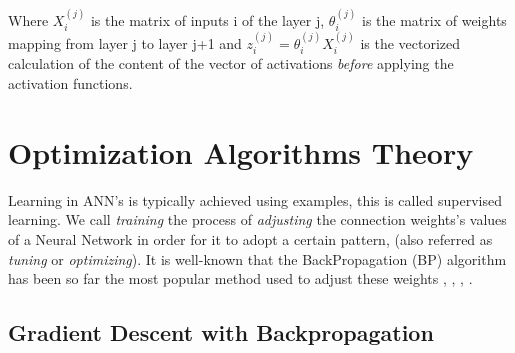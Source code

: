 \documentclass[a4paper,12pt, oneside]{memoir}
\begin{document}
Where $X_i^{(j)}$ is the matrix of inputs i of the layer j, $\theta_i^{(j)}$ is the matrix of weights mapping from layer j to layer j+1 and $z_i^{(j)} = \theta_i^{(j)} X_i^{(j)}$ is the vectorized calculation of the content of the vector of activations \textit{before} applying the activation functions.

\newpage

\section{Optimization Algorithms Theory}

Learning in ANN's is typically achieved using examples, this is called supervised learning. We call \textit{training} the process of \textit{adjusting} the connection weights's values of a Neural Network in order for it to adopt a certain pattern, (also referred as \textit{tuning} or \textit{optimizing}). It is well-known that the BackPropagation (BP) algorithm has been so far the most popular method used to adjust these weights \cite{haykin-1998}, \cite{tereza-2006}, \cite{coursera-machine-learning-stanford}, \cite{stanley-2002}.

\subsection{Gradient Descent with Backpropagation}
\end{document}
